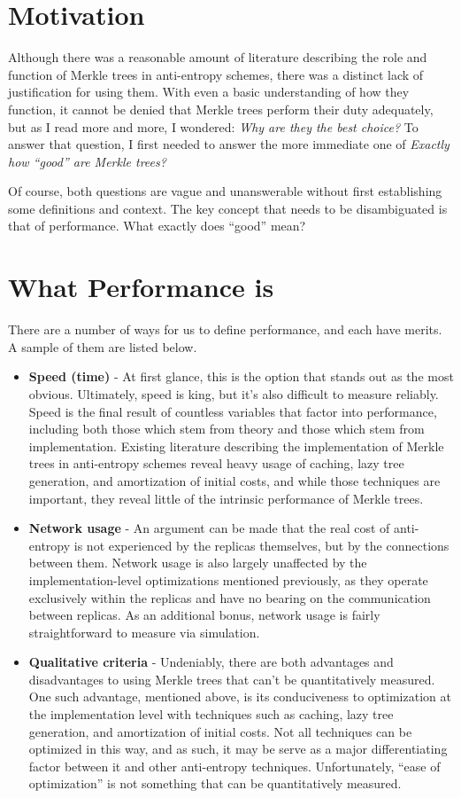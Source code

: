 \documentclass[11pt,letterpaper]{article}
\begin{document}
\section{Motivation}
Although there was a reasonable amount of literature describing the role and function of Merkle trees in anti-entropy schemes, there was a distinct lack of justification for using them. With even a basic understanding of how they function, it cannot be denied that Merkle trees perform their duty adequately, but as I read more and more, I wondered: \textit{Why are they the best choice?} To answer that question, I first needed to answer the more immediate one of \textit{Exactly how ``good'' are Merkle trees?}

Of course, both questions are vague and unanswerable without first establishing some definitions and context. The key concept that needs to be disambiguated is that of performance. What exactly does ``good'' mean?

\section{What Performance is}
There are a number of ways for us to define performance, and each have merits. A sample of them are listed below.

\begin{itemize}
\item \textbf{Speed (time)} - At first glance, this is the option that stands out as the most obvious. Ultimately, speed is king, but it's also difficult to measure reliably. Speed is the final result of countless variables that factor into performance, including both those which stem from theory and those which stem from implementation. Existing literature describing the implementation of Merkle trees in anti-entropy schemes reveal heavy usage of caching, lazy tree generation, and amortization of initial costs, and while those techniques are important, they reveal little of the intrinsic performance of Merkle trees.

\item \textbf{Network usage} - An argument can be made that the real cost of anti-entropy is not experienced by the replicas themselves, but by the connections between them. Network usage is also largely unaffected by the implementation-level optimizations mentioned previously, as they operate exclusively within the replicas and have no bearing on the communication between replicas. As an additional bonus, network usage is fairly straightforward to measure via simulation.

\item \textbf{Qualitative criteria} - Undeniably, there are both advantages and disadvantages to using Merkle trees that can't be quantitatively measured. One such advantage, mentioned above, is its conduciveness to optimization at the implementation level with techniques such as caching, lazy tree generation, and amortization of initial costs. Not all techniques can be optimized in this way, and as such, it may be serve as a major differentiating factor between it and other anti-entropy techniques. Unfortunately, ``ease of optimization'' is not something that can be quantitatively measured.
\end{itemize}
\end{document}
